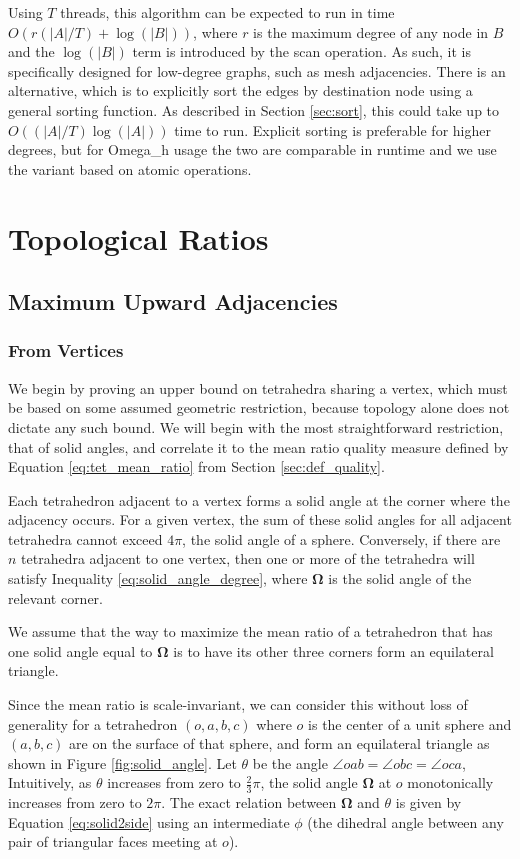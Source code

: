 Using $T$ threads, this algorithm can be expected to run in time
$O(r(|A|/T)+\log(|B|))$,
where $r$ is the maximum degree of any node in $B$ and the $\log(|B|)$
term is introduced by the scan operation.
As such, it is specifically designed for low-degree graphs,
such as mesh adjacencies.
There is an alternative, which is to explicitly sort the
edges by destination node using a general sorting function.
As described in Section \ref{sec:sort}, this could take up to
$O((|A|/T)\log(|A|))$ time to run.
Explicit sorting is preferable for higher degrees, but for Omega\_h usage
the two are comparable in runtime and we use the variant
based on atomic operations.

\chapter{Topological Ratios}

\section{Maximum Upward Adjacencies}

\subsection{From Vertices}
\label{app:vert_up_deg}

We begin by proving an upper bound on tetrahedra sharing a vertex,
which must be based on some assumed geometric restriction,
because topology alone does not dictate any such bound.
We will begin with the most straightforward restriction, that
of solid angles, and correlate it to the mean ratio quality measure
defined by Equation \ref{eq:tet_mean_ratio} from Section \ref{sec:def_quality}.

Each tetrahedron adjacent to a vertex forms a solid angle at
the corner where the adjacency occurs.
For a given vertex, the sum of these solid angles for all
adjacent tetrahedra cannot exceed $4\pi$, the solid angle of a sphere.
Conversely, if there are $n$ tetrahedra adjacent to one vertex,
then one or more of the tetrahedra will satisfy Inequality
\ref{eq:solid_angle_degree}, where $\mathbf{\Omega}$ is the
solid angle of the relevant corner.

We assume that the way to maximize the mean ratio of a tetrahedron
that has one solid angle equal to $\mathbf{\Omega}$ is to have
its other three corners form an equilateral triangle.

Since the mean ratio is scale-invariant, we can consider this
without loss of generality for a tetrahedron $(o,a,b,c)$ where
$o$ is the center of a unit sphere and $(a,b,c)$ are on the surface
of that sphere, and form an equilateral triangle
as shown in Figure \ref{fig:solid_angle}.
Let $\theta$ be the angle $\angle oab = \angle obc = \angle oca$,
Intuitively, as $\theta$ increases from zero to $\frac23\pi$,
the solid angle $\mathbf{\Omega}$ at $o$ monotonically
increases from zero to $2\pi$.
The exact relation between $\mathbf{\Omega}$ and $\theta$ is given by Equation
\ref{eq:solid2side}
using an intermediate $\phi$ (the dihedral angle between any pair of triangular
faces meeting at $o$).

